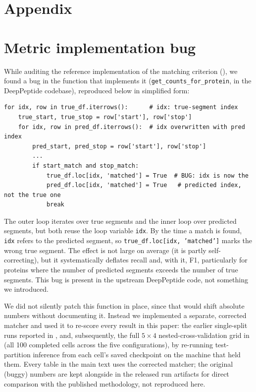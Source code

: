 \documentclass{article}
\begin{document}



\newpage
\appendix
\section*{Appendix}

\section{Metric implementation bug}
\label{sec:eval-metric}

While auditing the reference implementation of the matching criterion (), we found a bug in the function that implements it (\texttt{get\_counts\_for\_protein}, in the DeepPeptide codebase), reproduced below in simplified form:

\begin{lstlisting}
for idx, row in true_df.iterrows():      # idx: true-segment index
    true_start, true_stop = row['start'], row['stop']
    for idx, row in pred_df.iterrows():  # idx overwritten with pred index
        pred_start, pred_stop = row['start'], row['stop']
        ...
        if start_match and stop_match:
            true_df.loc[idx, 'matched'] = True  # BUG: idx is now the
            pred_df.loc[idx, 'matched'] = True   # predicted index, not the true one
            break
\end{lstlisting}

The outer loop iterates over true segments and the inner loop over predicted segments, but both reuse the loop variable \texttt{idx}. By the time a match is found, \texttt{idx} refers to the predicted segment, so \texttt{true\_df.loc[idx, 'matched']} marks the wrong true segment. The effect is not large on average (it is partly self-correcting), but it systematically deflates recall and, with it, F1, particularly for proteins where the number of predicted segments exceeds the number of true segments. This bug is present in the upstream DeepPeptide code, not something we introduced.

We did not silently patch this function in place, since that would shift absolute numbers without documenting it. Instead we implemented a separate, corrected matcher and used it to re-score every result in this paper: the earlier single-split runs reported in , and, subsequently, the full $5\times4$ nested-cross-validation grid in  (all 100 completed cells across the five configurations), by re-running test-partition inference from each cell's saved checkpoint on the machine that held them. Every table in the main text uses the corrected matcher; the original (buggy) numbers are kept alongside in the released run artifacts for direct comparison with the published methodology, not reproduced here.
\end{document}
